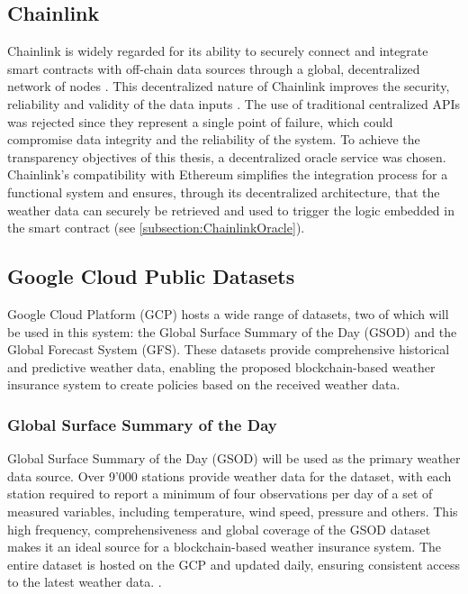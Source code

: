 \subsection{Chainlink}
Chainlink is widely regarded for its ability to securely connect and integrate smart contracts with off-chain data sources through a global, decentralized network of nodes \autocite{breidenbach2021chainlink}. This decentralized nature of Chainlink improves the security, reliability and validity of the data inputs \autocite{beniiche2020study}. The use of traditional centralized APIs was rejected since they represent a single point of failure, which could compromise data integrity and the reliability of the system. To achieve the transparency objectives of this thesis, a decentralized oracle service was chosen. Chainlink's compatibility with Ethereum simplifies the integration process for a functional system and ensures, through its decentralized architecture, that the weather data can securely be retrieved and used to trigger the logic embedded in the smart contract (see \cref{subsection:ChainlinkOracle}).

\subsection{Google Cloud Public Datasets}
Google Cloud Platform (GCP) hosts a wide range of datasets, two of which will be used in this system: the Global Surface Summary of the Day (GSOD) and the Global Forecast System (GFS). These datasets provide comprehensive historical and predictive weather data, enabling the proposed blockchain-based weather insurance system to create policies based on the received weather data.

\subsubsection{Global Surface Summary of the Day}\label{GSOD}
Global Surface Summary of the Day (GSOD) will be used as the primary weather data source. Over 9'000 stations provide weather data for the dataset, with each station required to report a minimum of four observations per day of a set of measured variables, including temperature, wind speed, pressure and others. This high frequency, comprehensiveness and global coverage of the GSOD dataset makes it an ideal source for a blockchain-based weather insurance system. The entire dataset is hosted on the GCP and updated daily, ensuring consistent access to the latest weather data. \autocite{NOAA_GSOD_2023}.

